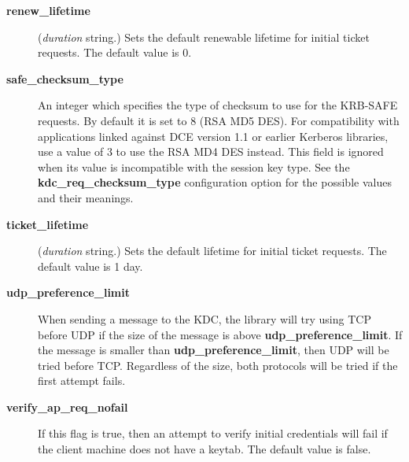 \documentclass[letterpaper,10pt,english]{sphinxmanual}
\begin{document}
\begin{description}
\item[{\textbf{renew\_lifetime}}] \leavevmode
(\emph{duration} string.)  Sets the default renewable lifetime
for initial ticket requests.  The default value is 0.

\item[{\textbf{safe\_checksum\_type}}] \leavevmode
An integer which specifies the type of checksum to use for the
KRB-SAFE requests.  By default it is set to 8 (RSA MD5 DES).  For
compatibility with applications linked against DCE version 1.1 or
earlier Kerberos libraries, use a value of 3 to use the RSA MD4
DES instead.  This field is ignored when its value is incompatible
with the session key type.  See the \textbf{kdc\_req\_checksum\_type}
configuration option for the possible values and their meanings.

\item[{\textbf{ticket\_lifetime}}] \leavevmode
(\emph{duration} string.)  Sets the default lifetime for initial
ticket requests.  The default value is 1 day.

\item[{\textbf{udp\_preference\_limit}}] \leavevmode
When sending a message to the KDC, the library will try using TCP
before UDP if the size of the message is above
\textbf{udp\_preference\_limit}.  If the message is smaller than
\textbf{udp\_preference\_limit}, then UDP will be tried before TCP.
Regardless of the size, both protocols will be tried if the first
attempt fails.

\item[{\textbf{verify\_ap\_req\_nofail}}] \leavevmode
If this flag is true, then an attempt to verify initial
credentials will fail if the client machine does not have a
keytab.  The default value is false.

\end{description}
\end{document}
